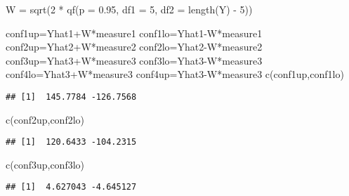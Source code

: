 \documentclass[
]{article}
\newenvironment{Shaded}{\begin{snugshade}}{\end{snugshade}}
\newcommand{\AttributeTok}[1]{\textcolor[rgb]{0.77,0.63,0.00}{#1}}
\newcommand{\DecValTok}[1]{\textcolor[rgb]{0.00,0.00,0.81}{#1}}
\newcommand{\FloatTok}[1]{\textcolor[rgb]{0.00,0.00,0.81}{#1}}
\newcommand{\FunctionTok}[1]{\textcolor[rgb]{0.00,0.00,0.00}{#1}}
\newcommand{\NormalTok}[1]{#1}
\newcommand{\OtherTok}[1]{\textcolor[rgb]{0.56,0.35,0.01}{#1}}
\newcommand{\SpecialCharTok}[1]{\textcolor[rgb]{0.00,0.00,0.00}{#1}}
\begin{document}
\begin{Shaded}
\begin{Highlighting}[]
\NormalTok{W }\OtherTok{=} \FunctionTok{sqrt}\NormalTok{(}\DecValTok{2} \SpecialCharTok{*} \FunctionTok{qf}\NormalTok{(}\AttributeTok{p =} \FloatTok{0.95}\NormalTok{, }\AttributeTok{df1 =} \DecValTok{5}\NormalTok{, }\AttributeTok{df2 =} \FunctionTok{length}\NormalTok{(Y) }\SpecialCharTok{{-}} \DecValTok{5}\NormalTok{))}


\NormalTok{conf1up}\OtherTok{=}\NormalTok{Yhat1}\SpecialCharTok{+}\NormalTok{W}\SpecialCharTok{*}\NormalTok{measure1 }
\NormalTok{conf1lo}\OtherTok{=}\NormalTok{Yhat1}\SpecialCharTok{{-}}\NormalTok{W}\SpecialCharTok{*}\NormalTok{measure1  }
\NormalTok{conf2up}\OtherTok{=}\NormalTok{Yhat2}\SpecialCharTok{+}\NormalTok{W}\SpecialCharTok{*}\NormalTok{measure2 }
\NormalTok{conf2lo}\OtherTok{=}\NormalTok{Yhat2}\SpecialCharTok{{-}}\NormalTok{W}\SpecialCharTok{*}\NormalTok{measure2  }
\NormalTok{conf3up}\OtherTok{=}\NormalTok{Yhat3}\SpecialCharTok{+}\NormalTok{W}\SpecialCharTok{*}\NormalTok{measure3  }
\NormalTok{conf3lo}\OtherTok{=}\NormalTok{Yhat3}\SpecialCharTok{{-}}\NormalTok{W}\SpecialCharTok{*}\NormalTok{measure3  }
\NormalTok{conf4lo}\OtherTok{=}\NormalTok{Yhat3}\SpecialCharTok{+}\NormalTok{W}\SpecialCharTok{*}\NormalTok{measure3}
\NormalTok{conf4up}\OtherTok{=}\NormalTok{Yhat3}\SpecialCharTok{{-}}\NormalTok{W}\SpecialCharTok{*}\NormalTok{measure3}
\FunctionTok{c}\NormalTok{(conf1up,conf1lo)}
\end{Highlighting}
\end{Shaded}

\begin{verbatim}
## [1]  145.7784 -126.7568
\end{verbatim}

\begin{Shaded}
\begin{Highlighting}[]
\FunctionTok{c}\NormalTok{(conf2up,conf2lo)}
\end{Highlighting}
\end{Shaded}

\begin{verbatim}
## [1]  120.6433 -104.2315
\end{verbatim}

\begin{Shaded}
\begin{Highlighting}[]
\FunctionTok{c}\NormalTok{(conf3up,conf3lo)}
\end{Highlighting}
\end{Shaded}

\begin{verbatim}
## [1]  4.627043 -4.645127
\end{verbatim}
\end{document}
